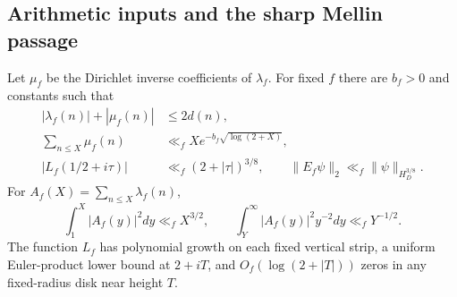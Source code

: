 \subsection{Arithmetic inputs and the sharp Mellin passage}

\begin{lemma}\label{hnew:arithmetic}
Let $\mu_f$ be the Dirichlet inverse coefficients of $\lambda_f$.
For fixed $f$ there are $b_f>0$ and constants such that
\begin{align}
 |\lambda_f(n)|+|\mu_f(n)|&\le2d(n),\label{hnew:divisor}\\
 \sum_{n\le X}\mu_f(n)&\ll_f Xe^{-b_f\sqrt{\log(2+X)}},\label{hnew:mertens}\\
 |L_f(1/2+i\tau)|&\ll_f(2+|\tau|)^{3/8},
 \qquad \|E_f\psi\|_2\ll_f\|\psi\|_{H_D^{3/8}}.\label{hnew:graph}
\end{align}
For $A_f(X)=\sum_{n\le X}\lambda_f(n)$,
\begin{equation}\label{hnew:mean-square}
 \int_1^X|A_f(y)|^2dy\ll_f X^{3/2},\qquad
 \int_Y^\infty|A_f(y)|^2y^{-2}dy\ll_f Y^{-1/2}.
\end{equation}
The function $L_f$ has polynomial growth on each fixed vertical
strip, a uniform Euler-product lower bound at $2+iT$, and
$O_f(\log(2+|T|))$ zeros in any fixed-radius disk near height $T$.
\end{lemma}
